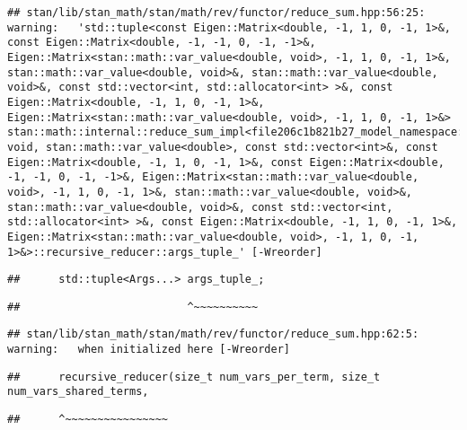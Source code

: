\documentclass[
]{article}
\begin{document}
\begin{verbatim}
## stan/lib/stan_math/stan/math/rev/functor/reduce_sum.hpp:56:25: warning:   'std::tuple<const Eigen::Matrix<double, -1, 1, 0, -1, 1>&, const Eigen::Matrix<double, -1, -1, 0, -1, -1>&, Eigen::Matrix<stan::math::var_value<double, void>, -1, 1, 0, -1, 1>&, stan::math::var_value<double, void>&, stan::math::var_value<double, void>&, const std::vector<int, std::allocator<int> >&, const Eigen::Matrix<double, -1, 1, 0, -1, 1>&, Eigen::Matrix<stan::math::var_value<double, void>, -1, 1, 0, -1, 1>&> stan::math::internal::reduce_sum_impl<file206c1b821b27_model_namespace::partial_log_lik_rsfunctor__, void, stan::math::var_value<double>, const std::vector<int>&, const Eigen::Matrix<double, -1, 1, 0, -1, 1>&, const Eigen::Matrix<double, -1, -1, 0, -1, -1>&, Eigen::Matrix<stan::math::var_value<double, void>, -1, 1, 0, -1, 1>&, stan::math::var_value<double, void>&, stan::math::var_value<double, void>&, const std::vector<int, std::allocator<int> >&, const Eigen::Matrix<double, -1, 1, 0, -1, 1>&, Eigen::Matrix<stan::math::var_value<double, void>, -1, 1, 0, -1, 1>&>::recursive_reducer::args_tuple_' [-Wreorder]
\end{verbatim}

\begin{verbatim}
##      std::tuple<Args...> args_tuple_;
\end{verbatim}

\begin{verbatim}
##                          ^~~~~~~~~~~
\end{verbatim}

\begin{verbatim}
## stan/lib/stan_math/stan/math/rev/functor/reduce_sum.hpp:62:5: warning:   when initialized here [-Wreorder]
\end{verbatim}

\begin{verbatim}
##      recursive_reducer(size_t num_vars_per_term, size_t num_vars_shared_terms,
\end{verbatim}

\begin{verbatim}
##      ^~~~~~~~~~~~~~~~~
\end{verbatim}
\end{document}
